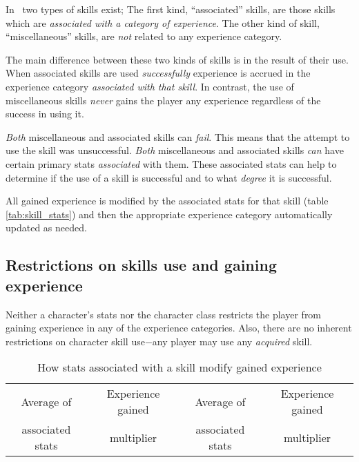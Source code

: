 In \cf\ two types of skills exist; The first kind, ``associated''
skills, are those skills which are {\em associated with a category of 
experience}.  The other kind of skill, ``miscellaneous'' skills,
are {\em not} related to any experience category.

The main difference between these two kinds of skills is in the 
result of their use.
When associated skills are used {\em successfully} experience is 
accrued in the experience category {\em associated with that skill}. 
In contrast, the use of miscellaneous skills {\em never} gains
the player any experience regardless of the success in using it.

{\em Both} miscellaneous and associated skills can {\em fail}. This means
that the attempt to use the skill was unsuccessful. {\em Both} 
miscellaneous and associated skills {\em can} have certain
primary stats {\em associated} with them. These associated stats can help   
to determine if the use of a skill is successful and to what
{\em degree} it is successful. 

All gained experience is modified by the associated 
stats for that skill (table \ref{tab:skill_stats}) and then the 
appropriate experience category automatically updated as needed.

\subsection{Restrictions on skills use and gaining experience}

Neither a character's stats nor the character class restricts the
player from gaining experience in any of the experience 
categories. Also, there are no inherent 
restrictions on character skill use$-$any player may
use any {\em acquired} skill. 

\begin{table}
\begin{center}
\caption{How stats associated with a skill modify gained experience}\label{tab:exp_stat_mod}
\footnotesize
\vskip 12pt
\begin{tabular}{|cc|cc|} \hline
Average of  & Experience gained  & Average of & Experience gained \\
associated stats &  multiplier & associated stats &  multiplier \\ \hline\hline

\hline
\end{tabular}
\end{center}
\end{table}

